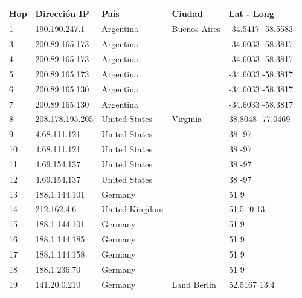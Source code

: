 
\begin{center}
 \begin{tabular}{|l|l|l|l|l|}
    \hline
    Hop &Dirección IP &País &Ciudad &Lat - Long \\ \hline \hline
	1 & 190.190.247.1 & Argentina & Buenos Aires & -34.5417 -58.5583 \\ \hline
	3 & 200.89.165.173 & Argentina &  & -34.6033 -58.3817 \\ \hline
	4 & 200.89.165.173 & Argentina &  & -34.6033 -58.3817 \\ \hline
	5 & 200.89.165.173 & Argentina &  & -34.6033 -58.3817 \\ \hline
	6 & 200.89.165.130 & Argentina &  & -34.6033 -58.3817 \\ \hline
	7 & 200.89.165.130 & Argentina &  & -34.6033 -58.3817 \\ \hline
	8 & 208.178.195.205 & United States & Virginia & 38.8048 -77.0469 \\ \hline
	9 & 4.68.111.121 & United States &  & 38 -97 \\ \hline
	10 & 4.68.111.121 & United States &  & 38 -97 \\ \hline
	11 & 4.69.154.137 & United States &  & 38 -97 \\ \hline
	12 & 4.69.154.137 & United States &  & 38 -97 \\ \hline
	13 & 188.1.144.101 & Germany &  & 51 9 \\ \hline
	14 & 212.162.4.6 & United Kingdom &  & 51.5 -0.13 \\ \hline
	15 & 188.1.144.101 & Germany &  & 51 9 \\ \hline
	16 & 188.1.144.185 & Germany &  & 51 9 \\ \hline
	17 & 188.1.144.158 & Germany &  & 51 9 \\ \hline
	18 & 188.1.236.70 & Germany &  & 51 9 \\ \hline
	19 & 141.20.0.210 & Germany & Land Berlin & 52.5167 13.4 \\ \hline
 \end{tabular}
\end{center}


